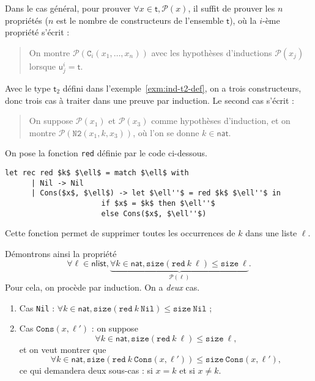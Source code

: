 \documentclass[../main]{subfiles}
\begin{document}
  \begin{rmk}
    Dans le cas général, 
    pour prouver  $\forall x \in  \mathsf{t}, \mathcal{P}(x)$, il suffit de prouver les $n$ propriétés ($n$ est le nombre de constructeurs de l'ensemble $\mathsf{t}$), où la $i$-ème propriété s'écrit :
    \begin{quote}
      On montre $\mathcal{P}(\mathtt{C}_i(x_1, \ldots, x_n))$ avec les hypothèses d'inductions $\mathcal{P}(x_j)$ lorsque $\mathsf{u}^i_j = \mathsf{t}$.
    \end{quote}
  \end{rmk}

  \begin{exm}
    Avec le type $\mathsf{t}_2$ défini dans l'exemple~\ref{exm:ind-t2-def}, on a trois constructeurs, donc trois cas à traiter dans une preuve par induction.
    Le second cas s'écrit :
    \begin{quote}
      On suppose $\mathcal{P}(x_1)$ et $\mathcal{P}(x_3)$ comme hypothèses d'induction, et on montre $\mathcal{P}(\mathtt{N2}(x_1, k, x_3))$, où l'on se donne $k \in  \mathsf{nat}$.
    \end{quote}
  \end{exm}

  \begin{exm}
    On pose la fonction \texttt{red} définie par le code ci-dessous.
    \begin{lstlisting}[language=caml,caption=Fonction de filtrage d'une liste]
      let rec red $k$ $\ell$ = match $\ell$ with
      | Nil -> Nil
      | Cons($x$, $\ell$) -> let $\ell''$ = red $k$ $\ell''$ in
                      if $x$ = $k$ then $\ell''$
                      else Cons($x$, $\ell''$)
    \end{lstlisting}
    Cette fonction permet de supprimer toutes les occurrences de $k$ dans une liste $\ell$.

    Démontrons ainsi la propriété
    \[
      \forall  \ell \in \mathsf{nlist}, \underbrace{\forall k \in \mathsf{nat}, \mathtt{size}(\mathtt{red}\ k\ \ell) \le \mathtt{size}\ \ell}_{\mathcal{P}(\ell)}
    .\] 
    Pour cela, on procède par induction. On a \textit{deux} cas.

    \begin{enumerate}
      \item Cas \texttt{Nil} : $\forall k \in \mathsf{nat}, \mathtt{size}(\mathtt{red}\ k\ \mathtt{Nil}) \le  \mathtt{size}\ \mathtt{Nil}$ ;
      \item Cas $\mathtt{Cons}(x, \ell')$ : on suppose \[
      \forall k \in \mathsf{nat}, \mathtt{size}(\mathtt{red}\ k\ \ell) \le \mathtt{size}\ \ell
      ,\] et on veut montrer que \[
        \forall k \in \mathsf{nat}, \mathtt{size}(\mathtt{red}\ k\ \mathtt{Cons}(x, \ell')) \le \mathtt{size}\ \mathtt{Cons}(x, \ell')
      ,\] ce qui demandera deux sous-cas : si $x = k$ et si $x \neq k$.
    \end{enumerate}
  \end{exm}
\end{document}
